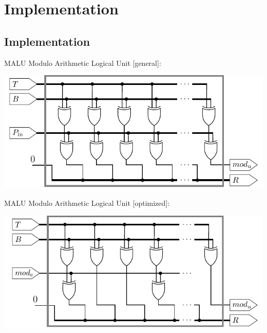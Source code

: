\documentclass[svgnames, handout,t]{beamer}
\begin{document}
\section{Implementation}
\subsection*{Implementation}
\begin{frame}{MALU}
	Modulo Arithmetic Logical Unit [general]:\\[8mm]
	\begin{center}
		\includegraphics[height=0.5\paperheight]{images/malu-basic}
	\end{center}
\end{frame}

\begin{frame}{MALU}
	Modulo Arithmetic Logical Unit [optimized]:\\[3mm]
	\begin{center}
		\includegraphics[height=0.5\paperheight]{images/malu-optimized}
	\end{center}
\end{frame}
\end{document}
